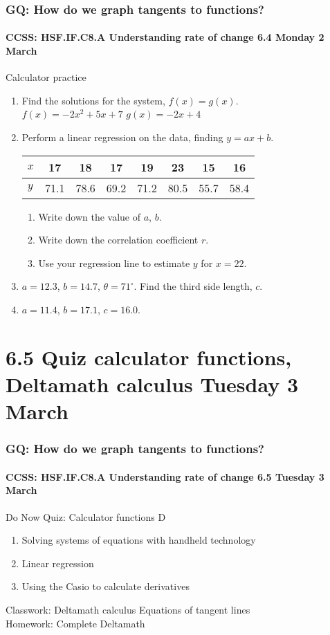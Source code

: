 \documentclass{beamer}
\begin{document}
      \frame
      {
        \frametitle{GQ: How do we graph tangents to functions?}
        \framesubtitle{CCSS: HSF.IF.C8.A Understanding rate of change \hfill \alert{6.4 Monday 2 March}}
        {Calculator practice}
          \begin{enumerate}
            \item Find the solutions for the system, $f(x)=g(x)$.\\
                $f(x)=-2x^2+5x+7$ \qquad $g(x)=-2x+4$ \vspace{0.3cm}
            \item Perform a linear regression on the data, finding $y=ax+b$. 
              \begin{center}
              \begin{tabular}{|l|c|c|c|c|c|c|c|}
                  \hline
                  $x$ & 17 & 18 & 17 & 19 & 23 & 15 & 16 \\ 
                  \hline 
                  $y$ & 71.1 & 78.6 & 69.2 & 71.2 & 80.5 & 55.7 & 58.4 \\ 
                  \hline 
                  \end{tabular}
              \end{center}
              \begin{enumerate}
                  \item Write down the value of $a$, $b$. %
                  \item Write down the correlation coefficient $r$.  %
                  \item Use your regression line to estimate $y$ for $x=22$.  %
              \end{enumerate}
            \item $a=12.3$, $b=14.7$, $\theta = 71^\circ$. Find the third side length, $c$.
            \item $a=11.4$, $b=17.1$, $c=16.0$.
          \end{enumerate}
          }

\section{6.5 Quiz calculator functions, Deltamath calculus \hfill Tuesday 3 March}
  \frame
  {
    \frametitle{GQ: How do we graph tangents to functions?}
    \framesubtitle{CCSS: HSF.IF.C8.A Understanding rate of change \hfill \alert{6.5 Tuesday 3 March}}
    \begin{block}{Do Now Quiz: Calculator functions D}
      \begin{enumerate}
        \item Solving systems of equations with handheld technology
        \item Linear regression
        \item Using the Casio to calculate derivatives
      \end{enumerate}
      \end{block}
      Classwork: Deltamath calculus Equations of tangent lines \\
      Homework: Complete Deltamath
      }
\end{document}
